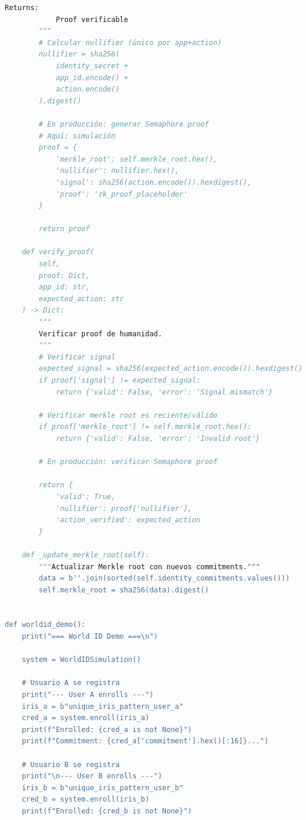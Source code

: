 \documentclass[11pt,a4paper,twoside]{book}
\theoremstyle{definition}
\theoremstyle{remark}
\begin{document}
\begin{lstlisting}[language=Python, caption={Worldcoin-style Proof of Humanity (conceptual)}]
        Returns:
            Proof verificable
        """
        # Calcular nullifier (único por app+action)
        nullifier = sha256(
            identity_secret + 
            app_id.encode() + 
            action.encode()
        ).digest()
        
        # En producción: generar Semaphore proof
        # Aquí: simulación
        proof = {
            'merkle_root': self.merkle_root.hex(),
            'nullifier': nullifier.hex(),
            'signal': sha256(action.encode()).hexdigest(),
            'proof': 'zk_proof_placeholder'
        }
        
        return proof
    
    def verify_proof(
        self,
        proof: Dict,
        app_id: str,
        expected_action: str
    ) -> Dict:
        """
        Verificar proof de humanidad.
        """
        # Verificar signal
        expected_signal = sha256(expected_action.encode()).hexdigest()
        if proof['signal'] != expected_signal:
            return {'valid': False, 'error': 'Signal mismatch'}
        
        # Verificar merkle root es reciente/válido
        if proof['merkle_root'] != self.merkle_root.hex():
            return {'valid': False, 'error': 'Invalid root'}
        
        # En producción: verificar Semaphore proof
        
        return {
            'valid': True,
            'nullifier': proof['nullifier'],
            'action_verified': expected_action
        }
    
    def _update_merkle_root(self):
        """Actualizar Merkle root con nuevos commitments."""
        data = b''.join(sorted(self.identity_commitments.values()))
        self.merkle_root = sha256(data).digest()


def worldid_demo():
    print("=== World ID Demo ===\n")
    
    system = WorldIDSimulation()
    
    # Usuario A se registra
    print("--- User A enrolls ---")
    iris_a = b"unique_iris_pattern_user_a"
    cred_a = system.enroll(iris_a)
    print(f"Enrolled: {cred_a is not None}")
    print(f"Commitment: {cred_a['commitment'].hex()[:16]}...")
    
    # Usuario B se registra
    print("\n--- User B enrolls ---")
    iris_b = b"unique_iris_pattern_user_b"
    cred_b = system.enroll(iris_b)
    print(f"Enrolled: {cred_b is not None}")
    

\end{lstlisting}
\end{document}

